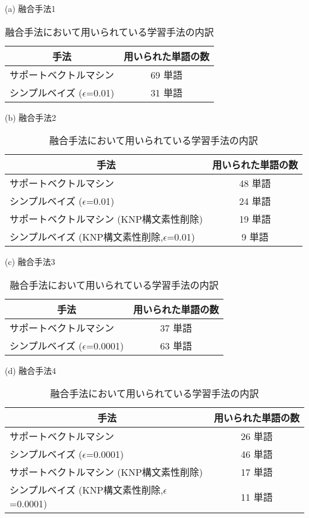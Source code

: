 \begin{table}[t]
\caption{融合手法において用いられている学習手法の内訳}
\label{tab:yuugou_wariai}

\vspace*{.5cm}

\hspace*{1.5cm}
\begin{minipage}[h]{20cm}

(a) 融合手法1

\begin{tabular}[c]{|l|c|}\hline
\multicolumn{1}{|c|}{手法} & \multicolumn{1}{|c|}{用いられた単語の数}  \\\hline
サポートベクトルマシン  &  69 単語\\
シンプルベイズ ($\epsilon$=0.01)  &  31 単語\\\hline
\end{tabular}

\vspace{0.5cm}

(b) 融合手法2

\begin{tabular}[c]{|l|c|}\hline
\multicolumn{1}{|c|}{手法} & \multicolumn{1}{|c|}{用いられた単語の数}  \\\hline
サポートベクトルマシン  &  48 単語\\
シンプルベイズ ($\epsilon$=0.01)  &  24 単語\\
サポートベクトルマシン (KNP構文素性削除) &  19 単語\\
シンプルベイズ (KNP構文素性削除,$\epsilon$=0.01)  &  9 単語\\\hline
\end{tabular}

\vspace{0.5cm}

(c) 融合手法3

\begin{tabular}[c]{|l|c|}\hline
\multicolumn{1}{|c|}{手法} & \multicolumn{1}{|c|}{用いられた単語の数}  \\\hline
サポートベクトルマシン  &  37 単語\\
シンプルベイズ ($\epsilon$=0.0001)  &  63 単語\\\hline
\end{tabular}

\vspace{0.5cm}

(d) 融合手法4

\begin{tabular}[c]{|l|c|}\hline
\multicolumn{1}{|c|}{手法} & \multicolumn{1}{|c|}{用いられた単語の数}  \\\hline
サポートベクトルマシン  &  26 単語\\
シンプルベイズ ($\epsilon$=0.0001)  &  46 単語\\
サポートベクトルマシン (KNP構文素性削除) &  17 単語\\
シンプルベイズ (KNP構文素性削除,$\epsilon$=0.0001)  &  11 単語\\\hline
\end{tabular}


\end{minipage}
\end{table}
